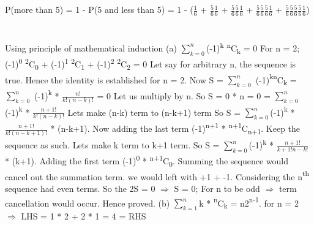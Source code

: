 \documentclass{report}
\begin{document}
{	\section{}
	P(more than 5) = 1 - P(5 and less than 5)
				   = 1 - ({$\frac{1}{6}$} + {$\frac{5}{6}$}{$\frac{1}{6}$} + {$\frac{5}{6}$}{$\frac{5}{6}$}{$\frac{1}{6}$} + {$\frac{5}{6}$}{$\frac{5}{6}$}{$\frac{5}{6}$}{$\frac{1}{6}$} + {$\frac{5}{6}$}{$\frac{5}{6}$}{$\frac{5}{6}$}{$\frac{5}{6}$}{$\frac{1}{6}$})
	{\newline}  
	\section{}
	Using principle of mathematical induction
	{\newline}
	(a) {$\sum_{k=0}^{n}$}(-1){\textsuperscript{k}} {\textsuperscript{n}}C{\textsubscript{k}} = 0
	For n = 2; (-1){\textsuperscript{0}} {\textsuperscript{2}}C{\textsubscript{0}} + (-1){\textsuperscript{1}} {\textsuperscript{2}}C{\textsubscript{1}} + (-1){\textsuperscript{2}} {\textsuperscript{2}}C{\textsubscript{2}} = 0
	Let say for arbitrary n, the sequence is true. Hence the identity is established for n = 2. Now
	{\newline}
	S = {$\sum_{k=0}^{n}$} (-1){\textsuperscript{k}}{\textsuperscript{n}}C{\textsubscript{k}} = {$\sum_{k=0}^{n}$} (-1){\textsuperscript{k}} * {$\frac{n!}{k!(n-k)!}$} = 0
	Let us multiply by n. So
	{\newline}
	S = 0 * n = 0 = {$\sum_{k=0}^{n}$}(-1){\textsuperscript{k}} * {$\frac{n+1!}{k!(n-k)!}$}
	Lets make (n-k) term to (n-k+1) term So S = {$\sum_{k=0}^{n}$}(-1){\textsuperscript{k}} * {$\frac{n+1!}{k!(n-k+1)!}$} * (n-k+1). Now adding the last term (-1){\textsuperscript{n+1}} * {\textsuperscript{n+1}}C{\textsubscript{n+1}}. Keep the sequence as such. Lets make k term to k+1 term. So S = {$\sum_{k=0}^{n}$}(-1){\textsuperscript{k}} * {$\frac{n+1!}{k+1!n-k!}$} * (k+1). Adding the first term (-1){\textsuperscript{0}} * {\textsuperscript{n+1}}C{\textsubscript{0}}. Summing the sequence would cancel out the summation term. we would left with +1 + -1. Considering the n{\textsuperscript{th}} sequence had even terms. So the 2S = 0 {$\Rightarrow$} S = 0;
	For n to be odd {$\Rightarrow$} term cancellation would occur.
	Hence proved. 
	{\newline}
	{\newline}
	{\newline}
	(b) {$\sum_{k=1}^{n}$}k * {\textsuperscript{n}}C{\textsubscript{k}} = n2{\textsuperscript{n-1}}.
	for n = 2 {$\Rightarrow$} LHS = 1 * 2 + 2 * 1 = 4 = RHS
}
\end{document}
